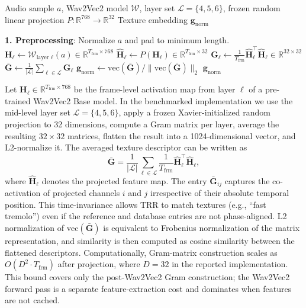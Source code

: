 \begin{algorithm}[ht]
		\caption{TRR Encoding}
		\label{alg:trr_encoding}
		\begin{algorithmic}
			\REQUIRE Audio sample $a$, Wav2Vec2 model $\mathcal{W}$, layer set $\mathcal{L}=\{4,5,6\}$, frozen random linear projection $P:\mathbb{R}^{768}\rightarrow\mathbb{R}^{32}$
			\ENSURE Texture embedding $\mathbf{g}_{\text{norm}}$

			\STATE \textbf{1. Preprocessing}: Normalize $a$ and pad to minimum length.
			\STATE $\mathbf{H}_{\ell} \leftarrow \mathcal{W}_{\text{layer }\ell}(a) \in \mathbb{R}^{T_{\text{frm}} \times 768}$
			\STATE $\widehat{\mathbf{H}}_{\ell} \leftarrow P(\mathbf{H}_{\ell}) \in \mathbb{R}^{T_{\text{frm}} \times 32}$
			\STATE $\mathbf{G}_{\ell} \leftarrow \frac{1}{T_{\text{frm}}}\widehat{\mathbf{H}}_{\ell}^{\top}\widehat{\mathbf{H}}_{\ell} \in \mathbb{R}^{32 \times 32}$
			\ENDFOR
			\STATE $\bar{\mathbf{G}} \leftarrow \frac{1}{|\mathcal{L}|}\sum_{\ell\in\mathcal{L}}\mathbf{G}_{\ell}$
			\STATE $\mathbf{g}_{\text{norm}} \leftarrow \mathrm{vec}(\bar{\mathbf{G}}) / \|\mathrm{vec}(\bar{\mathbf{G}})\|_2$
		\RETURN $\mathbf{g}_{\text{norm}}$
	\end{algorithmic}
\end{algorithm}

Let $\mathbf{H}_{\ell} \in \mathbb{R}^{T_{\text{frm}} \times 768}$ be the frame-level activation map from layer $\ell$ of a pre-trained Wav2Vec2 Base model. In the benchmarked implementation we use the mid-level layer set $\mathcal{L}=\{4,5,6\}$, apply a frozen Xavier-initialized random projection to 32 dimensions, compute a Gram matrix per layer, average the resulting $32\times 32$ matrices, flatten the result into a 1024-dimensional vector, and L2-normalize it. The averaged texture descriptor can be written as
\begin{equation}
		\bar{\mathbf{G}} = \frac{1}{|\mathcal{L}|}\sum_{\ell\in\mathcal{L}} \frac{1}{T_{\text{frm}}}\widehat{\mathbf{H}}_{\ell}^{\top}\widehat{\mathbf{H}}_{\ell},
\end{equation}
where $\widehat{\mathbf{H}}_{\ell}$ denotes the projected feature map. The entry $\bar{\mathbf{G}}_{ij}$ captures the co-activation of projected channels $i$ and $j$ irrespective of their absolute temporal position. This time-invariance allows TRR to match textures (e.g., ``fast tremolo'') even if the reference and database entries are not phase-aligned. L2 normalization of $\mathrm{vec}(\bar{\mathbf{G}})$ is equivalent to Frobenius normalization of the matrix representation, and similarity is then computed as cosine similarity between the flattened descriptors. Computationally, Gram-matrix construction scales as $O(D^2 \cdot T_{\text{frm}})$ after projection, where $D=32$ in the reported implementation. This bound covers only the post-Wav2Vec2 Gram construction; the Wav2Vec2 forward pass is a separate feature-extraction cost and dominates when features are not cached.

